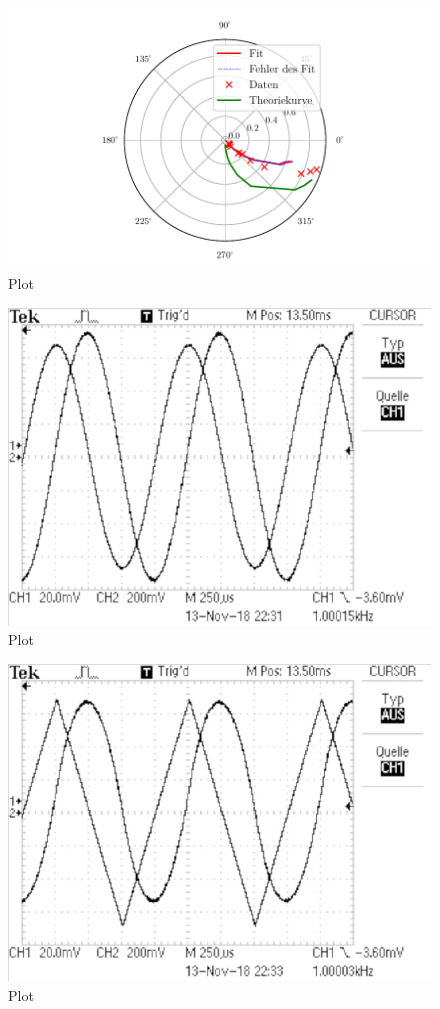 \begin{figure}
  \centering
  \includegraphics{build/plotd3.pdf}
  \caption{Plot}
  \label{fig:plotd3}
\end{figure}

\begin{figure}
  \centering
  \includegraphics{build/integrator1.pdf}
  \caption{Plot}
  \label{fig:plot}
\end{figure}

\begin{figure}
  \centering
  \includegraphics{build/integrator2.pdf}
  \caption{Plot}
  \label{fig:plot}
\end{figure}

